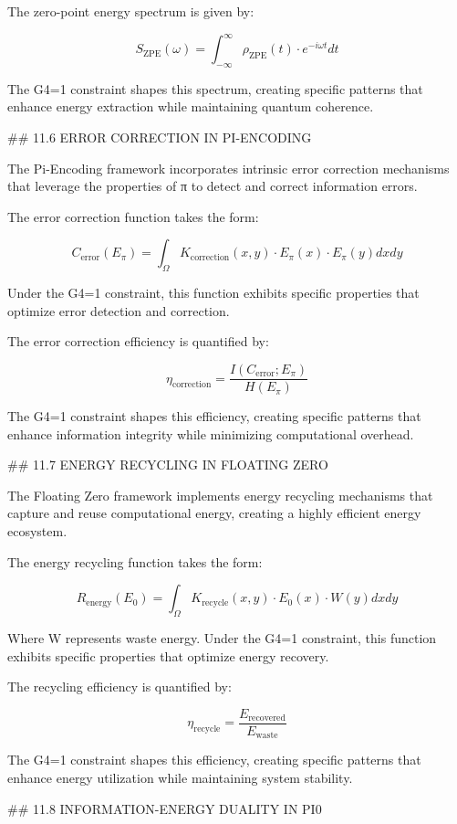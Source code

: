 The zero-point energy spectrum is given by:

$$S_{\text{ZPE}}(\omega) = \int_{-\infty}^{\infty} \rho_{\text{ZPE}}(t) \cdot e^{-i\omega t} dt$$

The G4=1 constraint shapes this spectrum, creating specific patterns that enhance energy extraction while maintaining quantum coherence.

## 11.6 ERROR CORRECTION IN PI-ENCODING

The Pi-Encoding framework incorporates intrinsic error correction mechanisms that leverage the properties of π to detect and correct information errors.

The error correction function takes the form:

$$C_{\text{error}}(E_{\pi}) = \int_{\Omega} K_{\text{correction}}(x, y) \cdot E_{\pi}(x) \cdot E_{\pi}(y) dx dy$$

Under the G4=1 constraint, this function exhibits specific properties that optimize error detection and correction.

The error correction efficiency is quantified by:

$$\eta_{\text{correction}} = \frac{I(C_{\text{error}}; E_{\pi})}{H(E_{\pi})}$$

The G4=1 constraint shapes this efficiency, creating specific patterns that enhance information integrity while minimizing computational overhead.

## 11.7 ENERGY RECYCLING IN FLOATING ZERO

The Floating Zero framework implements energy recycling mechanisms that capture and reuse computational energy, creating a highly efficient energy ecosystem.

The energy recycling function takes the form:

$$R_{\text{energy}}(E_0) = \int_{\Omega} K_{\text{recycle}}(x, y) \cdot E_0(x) \cdot W(y) dx dy$$

Where W represents waste energy. Under the G4=1 constraint, this function exhibits specific properties that optimize energy recovery.

The recycling efficiency is quantified by:

$$\eta_{\text{recycle}} = \frac{E_{\text{recovered}}}{E_{\text{waste}}}$$

The G4=1 constraint shapes this efficiency, creating specific patterns that enhance energy utilization while maintaining system stability.

## 11.8 INFORMATION-ENERGY DUALITY IN PI0

